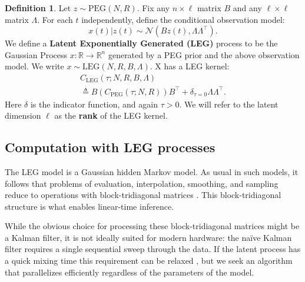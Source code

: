 \documentclass{article}
\theoremstyle{definition}
\newtheorem{definition}{Definition}
\newcommand{\diffusion}{N}
\newcommand{\rotparm}{R}
\newcommand{\latV}{z}
\newcommand{\obsV}{x}
\newcommand{\LEG}{\mathrm{LEG}}
\newcommand{\reals}{\mathbb{R}}
\newcommand{\LEGGP}{\mathrm{LEG}}
\newcommand{\PEG}{\mathrm{PEG}}
\newcommand{\PEGGP}{\mathrm{PEG}}
\begin{document}
\begin{definition}
Let $\latV \sim \PEGGP(\diffusion,\rotparm)$.  Fix any $n \times \ell$ matrix $B$ and any $\ell \times \ell$ matrix $\Lambda$.   For each $t$ independently, define the conditional observation model: 
\[
\obsV(t)|\latV(t) \sim \mathcal{N}(B \latV(t),\Lambda \Lambda ^\top).
\]
We define a \textbf{Latent Exponentially Generated (LEG)} process to be the Gaussian Process $x: \reals \rightarrow \reals^n$ generated by a PEG prior and the above observation model.  We write $x \sim \LEGGP(\diffusion,\rotparm,B,\Lambda)$.  X has a LEG kernel:
\begin{gather*}
C_\LEG(\tau;\diffusion,\rotparm,B,\Lambda) \\ \triangleq
B \left(C_\PEG(\tau;\diffusion,\rotparm)\right) B^\top + \delta_{\tau=0} \Lambda \Lambda^\top.
\end{gather*}
Here $\delta$ is the indicator function, and again $\tau>0$.  We will refer to the latent dimension $\ell$ as the \textbf{rank} of the LEG kernel.
\end{definition}

\subsection{Computation with LEG processes}

\label{subsec:leggpcomputation}

The LEG model is a Gaussian hidden Markov model.  As usual in such models, it follows that problems of evaluation, interpolation, smoothing, and sampling reduce to operations with block-tridiagonal matrices \cite{de1988likelihood}.  This block-tridiagonal structure is what enables linear-time inference. 

While the obvious choice for processing these block-tridiagonal matrices might be a Kalman filter, it is not ideally suited for modern hardware: the na\"ive Kalman filter requires a single sequential sweep through the data.  If the latent process has a quick mixing time this requirement can be relaxed \cite{gonzalez2009residual}, but we seek an algorithm that parallelizes efficiently regardless of the parameters of the model.  
\end{document}
